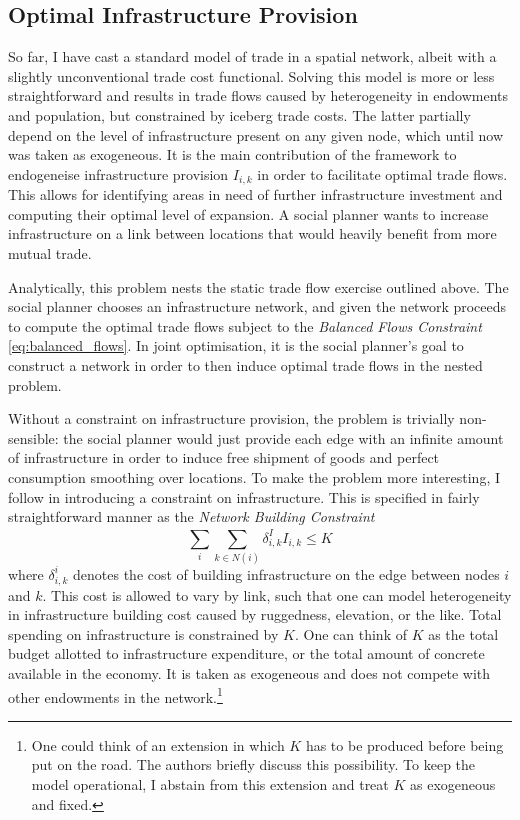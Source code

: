 \documentclass[11pt, oneside]{article}   	%
\begin{document}
\subsection{Optimal Infrastructure Provision}
So far, I have cast a standard model of trade in a spatial network, albeit with a slightly unconventional trade cost functional. Solving this model is more or less straightforward and results in trade flows caused by heterogeneity in endowments and population, but constrained by iceberg trade costs. The latter partially depend on the level of infrastructure present on any given node, which until now was taken as exogeneous. It is the main contribution of the \cite{fajgelbaum_optimal_2017} framework to endogeneise infrastructure provision $I_{i,k}$ in order to facilitate optimal trade flows. This allows for identifying areas in need of further infrastructure investment and computing their optimal level of expansion. A social planner wants to increase infrastructure on a link between locations that would heavily benefit from more mutual trade.

Analytically, this problem nests the static trade flow exercise outlined above. The social planner chooses an infrastructure network, and given the network proceeds to compute the optimal trade flows subject to the \emph{Balanced Flows Constraint} \eqref{eq:balanced_flows}. In joint optimisation, it is the social planner's goal to construct a network in order to then induce optimal trade flows in the nested problem.

Without a constraint on infrastructure provision, the problem is trivially non-sensible: the social planner would just provide each edge with an infinite amount of infrastructure in order to induce free shipment of goods and perfect consumption smoothing over locations. To make the problem more interesting, I follow \citeauthor{fajgelbaum_optimal_2017} in introducing a constraint on infrastructure. This is specified in fairly straightforward manner as the \emph{Network Building Constraint}
\begin{equation}
  \sum_{i}^{}\sum_{k\in N(i)}^{}\delta^{I}_{i,k}I_{i,k} \leq K
  \label{eq:network_building}
\end{equation}
where $\delta^{i}_{i,k}$ denotes the cost of building infrastructure on the edge between nodes $i$ and $k$. This cost is allowed to vary by link, such that one can model heterogeneity in infrastructure building cost caused by ruggedness, elevation, or the like. Total spending on infrastructure is constrained by $K$. One can think of $K$ as the total budget allotted to infrastructure expenditure, or the total amount of concrete available in the economy. It is taken as exogeneous and does not compete with other endowments in the network.\footnote{One could think of an extension in which $K$ has to be produced before being put on the road. The authors briefly discuss this possibility. To keep the model operational, I abstain from this extension and treat $K$ as exogeneous and fixed.}
\end{document}
